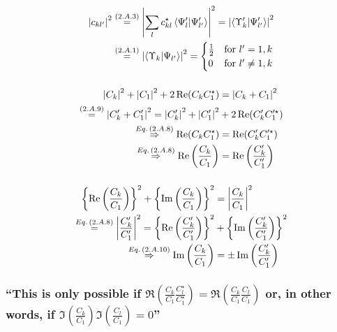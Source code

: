 \begin{align*}
	\abs{c_{kl^\prime}}^2&\overset{\eqc{2.A.3}}{=}\abs{\sum\limits_{l}c_{kl}^\star \innerproduct{\Psi_l^\prime}{\Psi_{l^\prime}^\prime}}^2=\abs{\innerproduct{\Upsilon_k^\prime}{\Psi_{l^\prime}^\prime}}^2\\
	&\overset{\eqc{2.A.1}}{=}\abs{\innerproduct{\Upsilon_k}{\Psi_{l^\prime}}}^2=\begin{cases}
		\frac{1}{2} &\text{for } l^\prime=1,k\\
		0&\text{for } l^\prime\neq1,k\end{cases}
\end{align*}

\subsubsection{ }
\begin{align*} 
	\abs{C_k}^2+\abs{C_1}^2+2\Re(C_k C_1^\star)&=\abs{C_k+C_1}^2\\
	\overset{({2.A.9})}{=}\abs{C_k^\prime+C_1^\prime}^2=\abs{C_k^\prime}^2+\abs{C_1^\prime}^2&+2\Re(C_k^\prime C_1^{\prime\star})\\
	\overset{Eq.\,({2.A.8})}{\Rightarrow} \Re(C_k C_1^\star)&=\Re(C_k^\prime C_1^{\prime\star})\\
	\overset{Eq.\,({2.A.8})}{\Rightarrow} \Re\left(\dfrac{C_k}{C_1}\right)&=\Re\left(\dfrac{C_k^\prime}{C_1^\prime}\right)
\end{align*}

\subsubsection{ }
\begin{align*} 
	\left\lbrace\Re\left(\dfrac{C_k}{C_1}\right)\right\rbrace^2+\left\lbrace\Im\left(\dfrac{C_k}{C_1}\right)\right\rbrace^2&=\abs{\dfrac{C_k}{C_1}}^2\\
	\overset{Eq.\,({2.A.8})}{=}\abs{\dfrac{C_k^\prime}{C_1^\prime}}^2=\left\lbrace\Re\left(\dfrac{C_k^\prime}{C_1^\prime}\right)\right\rbrace^2&+\left\lbrace\Im\left(\dfrac{C_k^\prime}{C_1^\prime}\right)\right\rbrace^2\\
	\overset{Eq.\,({2.A.10})}{\Rightarrow} \Im\left(\dfrac{C_k}{C_1}\right)&=\pm\Im\left(\dfrac{C_k^\prime}{C_1^\prime}\right)
\end{align*}

\subsubsection{\enquote{This is only possible if $\Re\left(\frac{C_k}{C_1}\frac{C_l^\star}{C_1^\star}\right)=\Re\left(\frac{C_k}{C_1}\frac{C_l}{C_1}\right)$ or, in other words, if $\Im\left(\frac{C_k}{C_1}\right)\Im\left(\frac{C_l}{C_1}\right)=0$} }

